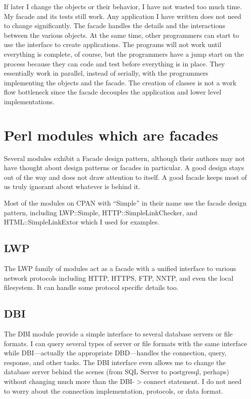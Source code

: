 If later I change the objects or their behavior, I have not wasted too
much time.  My facade and its tests still work. Any application I have
written does not need to change significantly.  The facade handles the
details and the interactions between the various objects. At the same
time, other programmers can start to use the interface to create
applications.  The programs will not work until everything is
complete, of course, but the programmers have a jump start on the
process because they can code and test before everything is in place. 
They essentially work in parallel, instead of serially, with the
programmers implementing the objects and the facade.  The creation of
classes is not a work flow bottleneck since the facade decouples
the application and lower level implementations.

\section{Perl modules which are facades}

Several modules exhibit a Facade design pattern, although their
authors may not have thought about design patterns or facades in
particular.  A good design stays out of the way and does not draw
attention to itself.  A good facade keeps most of us truly ignorant
about whatever is behind it.

Most of the modules on CPAN with ``Simple'' in their name use the
facade design pattern, including LWP::Simple, HTTP::SimpleLinkChecker,
and HTML::SimpleLinkExtor which I used for examples.

	\subsection{LWP}

The LWP family of modules act as a facade with a unified interface to
various network protocols including HTTP, HTTPS, FTP, NNTP, and even
the local filesystem.  It can handle some protocol specific details
too.  
	
	\subsection{DBI}
	
The DBI module provide a simple interface to several database servers
or file formats.  I can query several types of server or file formats
with the same interface while DBI---actually the appropriate
DBD---handles the connection, query, response, and other tasks.  The
DBI interface even allows me to  change the database server behind the
scenes (from SQL Server to postgresql, perhaps) without changing much
more than the DBI-$>$connect statement.  I do not need to worry about
the connection implementation, protocols, or data format.


